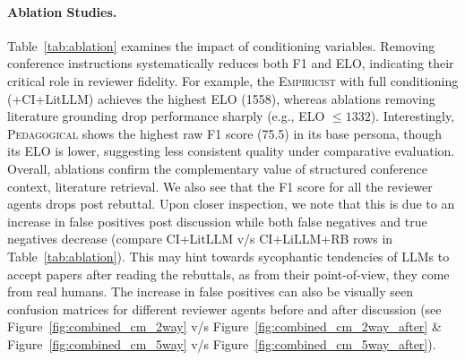 \documentclass{article} %
\newcommand{\shrink}[1][0.5]{\vspace{-#1\baselineskip}}
\begin{document}
\paragraph{Ablation Studies.}\shrink[0.75]
Table~\ref{tab:ablation} examines the impact of conditioning variables. Removing conference instructions systematically reduces both F1 and ELO, indicating their critical role in reviewer fidelity. For example, the \textsc{Empiricist} with full conditioning (+CI+LitLLM) achieves the highest ELO (1558), whereas ablations removing literature grounding drop performance sharply (e.g., ELO $\leq 1332$). Interestingly, \textsc{Pedagogical} shows the highest raw F1 score (75.5) in its base persona, though its ELO is lower, suggesting less consistent quality under comparative evaluation. Overall, ablations confirm the complementary value of structured conference context, literature retrieval.
We also see that the F1 score for all the reviewer agents drops post rebuttal.
Upon closer inspection, we note that this is due to an increase in false positives post discussion while both false negatives and true negatives decrease (compare CI+LitLLM v/s CI+LiLLM+RB rows in Table~\ref{tab:ablation}).
This may hint towards sycophantic tendencies of LLMs to accept papers after reading the rebuttals, as from their point-of-view, they come from real humans.
The increase in false positives can also be visually seen confusion matrices for different reviewer agents before and after discussion (see Figure~\ref{fig:combined_cm_2way} v/s Figure~\ref{fig:combined_cm_2way_after} \& Figure~\ref{fig:combined_cm_5way} v/s Figure~\ref{fig:combined_cm_5way_after}).
\end{document}
